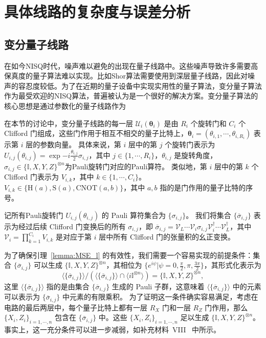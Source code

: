 \chapter{具体线路的复杂度与误差分析}

\section{变分量子线路}
在如今NISQ时代，噪声难以避免的出现在量子线路中。这些噪声导致许多需要高保真度的量子算法难以实现。比如Shor算法需要使用到深层量子线路，因此对噪声的容忍度较低。为了在近期的量子设备中实现实用性的量子算法，变分量子算法作为最受欢迎的NISQ算法，普遍被认为是一个很好的解决方案。变分量子算法的核心思想是通过参数化的量子线路作为

在本节的讨论中，变分量子线路的每一层 $\mathcal{U}_i(\bm{\theta}_i)$ 是由 $R_i$ 个旋转门和 $C_i$ 个 Clifford 门组成，这些门作用于相互不相交的量子比特上，$\bm{\theta}_i=(\theta_{i,1},\cdots,\theta_{i,R_i})$ 表示第 $i$ 层的参数向量。
具体来说，第 $i$ 层中的第 $j$ 个旋转门表示为 $U_{i, j}(\theta_{i,j})=\exp{-i \frac{\theta_{i,j}}{2} \sigma_{i,j}}$，其中 $j \in \{1, \cdots , R_i\}$，$\theta_{i,j}$ 是旋转角度，$\sigma_{i, j}\in \{\mathbb{I}, X,Y,Z\}^{\otimes n}$为Pauli旋转门对应的Pauli算符。
类似地，第 $i$ 层中的第 $k$ 个 Clifford 门表示为 $V_{i,k}$，其中 $k \in \{1, \cdots , C_i\}$。$V_{i,k}\in\{\mathrm{H}(a),\mathrm{S}(a),\mathrm{CNOT}(a,b)\}$，其中 $a,b $ 指的是门作用的量子比特的序号。

记所有Pauli旋转门 $U_{i,j}(\theta_{i,j})$ 的 Pauli 算符集合为 $\{\sigma_{i,j}\}$。
我们将集合 $\{\overline{\sigma}_{i,j}\}$ 表示为经过后续 Clifford 门变换后的所有 $\sigma_{i,j}$，即 $\overline{\sigma}_{i,j}= \mathcal{V}_{L} \cdots \mathcal{V}_{i} \sigma_{i,j} \mathcal{V}_{i}^\dagger \cdots \mathcal{V}_{L}^\dagger$，其中 $\mathcal{V}_{i} = \prod_{k=1}^{C_i} V_{i,k}$ 是对应于第 $i$ 层中所有 Clifford 门的张量积的幺正变换。

为了确保引理~\ref{lemma:MSE_l} 的有效性，我们需要一个容易实现的前提条件：集合 $\{\overline{\sigma}_{i,j}\}$ 可以生成 $\{\mathbb{I}, X, Y, Z\}^{\otimes n}$，其相位为 $\{e^{i\psi}|\psi=0,\frac{\pi}{2},\pi,\frac{3\pi}{2}\}$，其形式化表示为
\begin{equation}\label{eq:generate}
  \langle \{\overline{\sigma}_{i,j}\}\rangle/\left(\langle \{\overline{\sigma}_{i,j}\}\rangle\cap\langle i\mathbb{I}^{\otimes n}\rangle\right)=\{\mathbb{I},X,Y,Z\}^{\otimes n},
\end{equation}
这里 $\langle \{\overline{\sigma}_{i,j}\} \rangle$ 指的是由集合 $\{\overline{\sigma}_{i,j}\}$ 生成的 Pauli 子群，这意味着 $\langle \{\overline{\sigma}_{i,j}\}\rangle$ 中的元素可以表示为 $\{\overline{\sigma}_{i,j}\}$ 中元素的有限乘积。
为了证明这一条件确实容易满足，考虑在电路的最后两层中，每个量子比特上都有一层 $R_X$ 门和一层 $R_Z$ 门作用，那么 $\{X_i, Z_i\}_{i=1,\cdots,n}$ 包含在 $\{\overline{\sigma}_{i,j}\}$ 中。这些 $\{ X_i,Z_i \}_{i=1,\cdots,n}$ 足以生成 $\{\mathbb{I},X,Y,Z\}^{\otimes n}$。事实上，这一充分条件可以进一步减弱，如补充材料~{VIII}~\cite{supplementary} 中所示。


